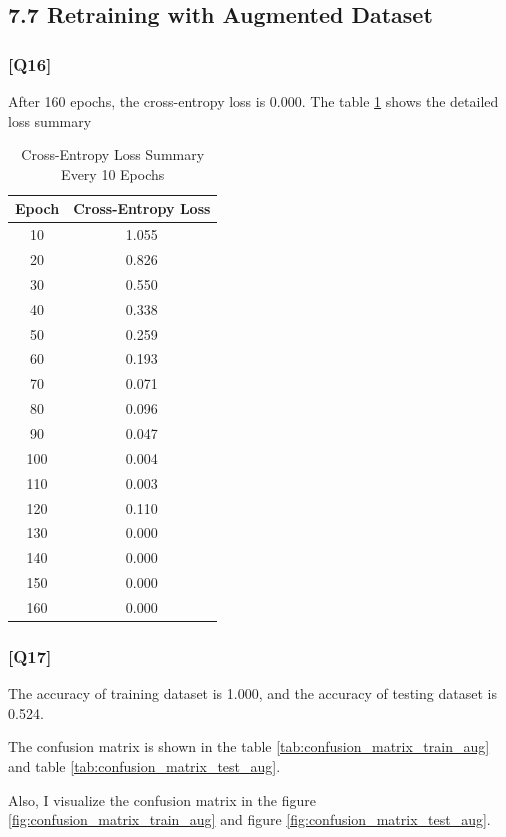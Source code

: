 \documentclass{article}
\begin{document}
\subsection*{7.7 Retraining with Augmented Dataset}

\subsubsection*{[Q16]}

After 160 epochs, the cross-entropy loss is 0.000. The table \ref{tab:cross_entropy_loss_aug} shows the detailed loss summary

\begin{table}[ht]
    \centering
    \caption{Cross-Entropy Loss Summary Every 10 Epochs}
    \begin{tabular}{cc}
    \toprule
    Epoch & Cross-Entropy Loss \\
    \midrule
    10  & 1.055 \\
    20  & 0.826 \\
    30  & 0.550 \\
    40  & 0.338 \\
    50  & 0.259 \\
    60  & 0.193 \\
    70  & 0.071 \\
    80  & 0.096 \\
    90  & 0.047 \\
    100 & 0.004 \\
    110 & 0.003 \\
    120 & 0.110 \\
    130 & 0.000 \\
    140 & 0.000 \\
    150 & 0.000 \\
    160 & 0.000 \\
    \bottomrule
    \end{tabular}
    \label{tab:cross_entropy_loss_aug}
\end{table}


\subsubsection*{[Q17]}
The accuracy of training dataset is 1.000, and the accuracy of testing dataset is 0.524.

The confusion matrix is shown in the table \ref{tab:confusion_matrix_train_aug} and table \ref{tab:confusion_matrix_test_aug}.

Also, I visualize the confusion matrix in the figure \ref{fig:confusion_matrix_train_aug} and figure \ref{fig:confusion_matrix_test_aug}.
\end{document}
